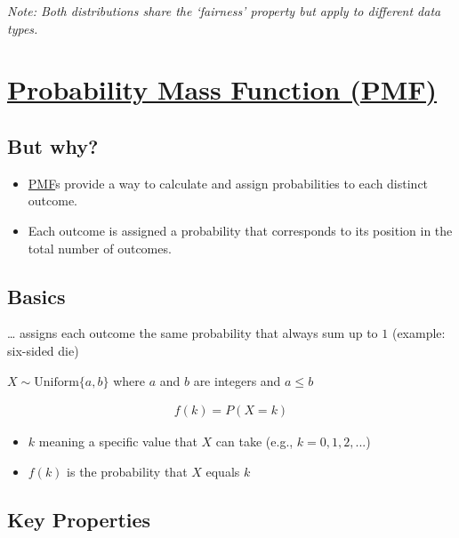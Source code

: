 \documentclass[
  a4paper,
]{scrbook}
\providecommand{\tightlist}{%
  \setlength{\itemsep}{0pt}\setlength{\parskip}{0pt}}\usepackage{longtable,booktabs,array}
\begin{document}
\begin{minipage}{\linewidth}
\emph{Note: Both distributions share the `fairness' property but apply to different data types.}\\
\end{minipage}
\endgroup

\section{\texorpdfstring{\hyperref[acronyms_PMF]{Probability Mass
Function (PMF)}}{Probability Mass Function (PMF)}}\label{section-2}

\subsection{But why?}\label{but-why}

\begin{itemize}
\tightlist
\item
  \hyperref[acronyms_PMF]{PMF}s provide a way to calculate and assign
  probabilities to each distinct outcome.
\item
  Each outcome is assigned a probability that corresponds to its
  position in the total number of outcomes.
\end{itemize}

\subsection{Basics}\label{basics}

\ldots{} assigns each outcome the same probability that always sum up to
\(1\) (example: six-sided die)

\(X \sim \mathrm{Uniform}\{a,b\}\) where \(a\) and \(b\) are integers
and \(a\leq b\)

\begin{align}
f(k) = P (X = k)
\end{align}

\begin{itemize}
\tightlist
\item
  \(k\) meaning a specific value that \(X\) can take (e.g.,
  \(k = 0,1,2, ...\))
\item
  \(f(k)\) is the probability that \(X\) equals \(k\)
\end{itemize}

\subsection{Key Properties}\label{key-properties}
\end{document}
